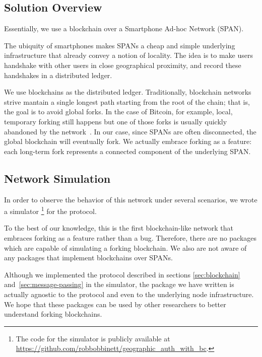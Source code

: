 \subsection{Solution Overview}

Essentially,
we use a blockchain over a Smartphone Ad-hoc Network (SPAN).

The ubiquity of smartphones
makes SPANs a cheap and simple underlying infrastructure
that already convey a notion of locality.
The idea is to make users handshake with other users in close geographical proximity,
and record these handshakes in a distributed ledger.

We use blockchains as the distributed ledger.
Traditionally,
blockchain networks strive mantain a single longest path
starting from the root of the chain;
that is,
the goal is to avoid global forks.
In the case of Bitcoin,
for example,
local, temporary forking still happens
but one of those forks is usually quickly abandoned by the network~\cite{decker_2013}.
In our case,
since SPANs are often disconnected,
the global blockchain will eventually fork.
We actually embrace forking as a feature:
each long-term fork represents a connected component of the underlying SPAN.


\subsection{Network Simulation}

In order to observe the behavior of this network under several scenarios,
we wrote a simulator%
\footnote{
	The code for the simulator is publicly available at
	\url{https://github.com/robbobbinett/geographic_auth_with_bc}.
}
for the protocol.

To the best of our knowledge,
this is the first blockchain-like network
that embraces forking as a feature rather than a bug.
Therefore,
there are no packages which are capable of simulating a forking blockchain.
We also are not aware of any packages that implement blockchains over SPANs.

Although we implemented the protocol described in sections
\ref{sec:blockchain} and~\ref{sec:message-passing}
in the simulator,
the package we have written is actually agnostic to the protocol
and even to the underlying node infrastructure.
We hope that these packages can be used by other researchers
to better understand forking blockchains.
